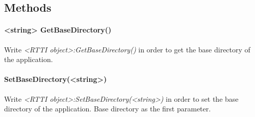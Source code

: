 \subsection{Methods}

\paragraph{<string> GetBaseDirectory()}
Write \emph{<RTTI object>:GetBaseDirectory()} in order to get the base directory of the application.

\paragraph{SetBaseDirectory(<string>)}
Write \emph{<RTTI object>:SetBaseDirectory(<string>)} in order to set the base directory of the application. Base directory as the first parameter.
